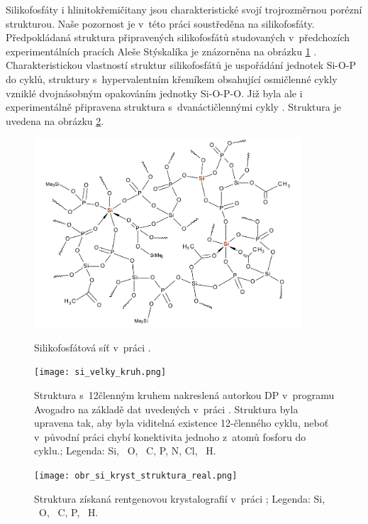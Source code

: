 \documentclass[
digital, %
table,   %
nolof,     %
nolot,     %
oneside,
]{fithesis3}
\begin{document}
Silikofosfáty i hlinitokřemičitany jsou charakteristické svojí trojrozměrnou  porézní strukturou. Naše pozornost je v~této práci soustředěna na silikofosfáty. Předpokládaná struktura připravených silikofosfátů studovaných v~předchozích experimentálních pracích Aleše Stýskalíka je znázorněna na obrázku \ref{si_polymer_cely} \cite{Styskalik2015thesis}. Charakteristickou vlastností struktur silikofosfátů je uspořádání jednotek Si-O-P do cyklů, struktury s~hypervalentním křemíkem obsahující osmičlenné cykly vzniklé dvojnásobným opakováním jednotky Si-O-P-O. Již byla ale i experimentálně připravena struktura s~dvanáctičlennými cykly \cite{velky_cyklus}. Struktura je uvedena na obrázku \ref{velky_cyklus}.
\begin{figure}
\caption{Silikofosfátová síť v~práci \cite{Styskalik2015thesis}.}\includegraphics[width=10cm]{si_polymer_cely.png}
\label{si_polymer_cely}\end{figure}

\begin{figure}
\caption{Struktura s~12členným kruhem nakreslená autorkou DP v~programu Avogadro na základě dat uvedených v~práci \cite{velky_cyklus}.  Struktura byla upravena tak, aby byla viditelná existence 12-členného cyklu, neboť v~původní práci chybí konektivita jednoho z~atomů fosforu do cyklu.;  Legenda:  Si, ~O, ~C,  P,  N,  Cl, ~H.}
\center \texttt{[image: si\_velky\_kruh.png]} \label{velky_cyklus} \end{figure}

\begin{figure}
\caption{Struktura získaná rentgenovou krystalografií v~práci \cite{C3NJ00721A};  Legenda:  Si, ~O, ~C,  P, ~H. }
\center \texttt{[image: obr\_si\_kryst\_struktura\_real.png]} \label{rtg_koordinace_sest} \end{figure}
\end{document}
